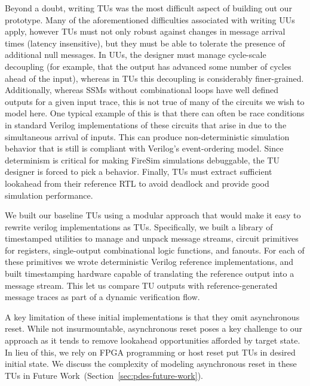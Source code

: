 Beyond a doubt, writing TUs was the most difficult aspect of building out our prototype.
Many of the aforementioned difficulties associated with
writing UUs apply, however TUs
must not only robust against changes in message arrival times (latency
insensitive), but they must be able to tolerate the presence of additional null
messages. In UUs, the designer must manage cycle-scale decoupling (for
example, that the output has advanced some number of cycles ahead of the
input), whereas in TUs this decoupling is considerably
finer-grained. Additionally, whereas SSMs without combinational loops have well defined
outputs for a given input trace, this is not true of many of the circuits we
wish to model here. One typical example of this is that there can often be
race conditions in standard Verilog implementations of these circuits that arise in due to the simultaneous arrival of inputs.
This can produce non-deterministic simulation behavior that is still is
compliant with Verilog's event-ordering model. Since determinism is
critical for making FireSim simulations debuggable, the TU designer is forced to pick a
behavior. Finally, TUs must extract sufficient lookahead from their
reference RTL to avoid deadlock and provide good simulation performance.

We built our baseline TUs using a modular approach that would make it easy to
rewrite verilog implementations as TUs. Specifically, we built a library of
timestamped utilities to manage and unpack message streams, circuit primitives
for registers, single-output combinational logic functions, and fanouts. For
each of these primitives we wrote deterministic Verilog reference
implementations, and built timestamping hardware capable of translating the
reference output into a message stream. This let us compare TU outputs with
reference-generated message traces as part of a dynamic verification flow.

A key limitation of these initial implementations is that they omit
asynchronous reset. While not insurmountable, asynchronous reset poses a key
challenge to our approach as it tends to remove lookahead opportunities afforded
by target state. In lieu of this, we rely on FPGA programming or host reset put
TUs in desired initial state.  We discuss the complexity of modeling asynchronous
reset in these TUs in Future Work~(Section~\ref{sec:pdes-future-work}).


